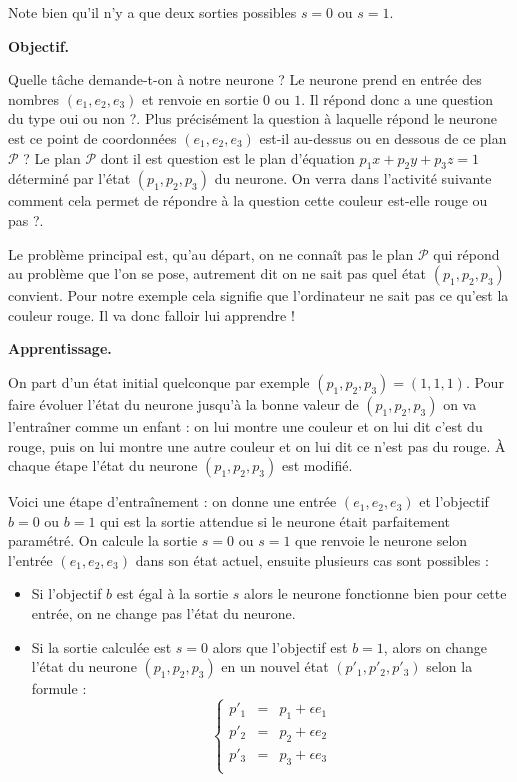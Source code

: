 \documentclass[11pt,class=report,crop=false]{standalone}
\begin{document}
\begin{cours}[Neurone]
Note bien qu'il n'y a que deux sorties possibles $s=0$ ou $s=1$.

\medskip
\textbf{Objectif.}

Quelle tâche demande-t-on à notre neurone ? Le neurone prend en entrée des nombres $(e_1,e_2,e_3)$ et renvoie en sortie $0$ ou $1$. Il répond donc a une question du type \og{}oui ou non ?\fg{}.
Plus précisément la question à laquelle répond le neurone est \og{}ce point de coordonnées $(e_1,e_2,e_3)$ est-il au-dessus ou en dessous de ce plan $\mathcal{P}$ ?\fg{} Le plan $\mathcal{P}$ dont il est question est le plan d'équation $p_1x+p_2y+p_3z=1$ déterminé par l'état $(p_1,p_2,p_3)$ du neurone.
On verra dans l'activité suivante comment cela permet de répondre à la question \og{}cette couleur est-elle rouge ou pas ?\fg{}.

Le problème principal est, qu'au départ, on ne connaît pas le plan $\mathcal{P}$ qui répond au problème que l'on se pose, autrement dit on ne sait pas quel état $(p_1,p_2,p_3)$ convient. Pour notre exemple cela signifie que l'ordinateur ne sait pas ce qu'est la couleur rouge. Il va donc falloir lui apprendre !

\medskip
\textbf{Apprentissage.}

On part d'un état initial quelconque par exemple $(p_1,p_2,p_3)=(1,1,1)$.
Pour faire évoluer l'état du neurone jusqu'à la bonne valeur de $(p_1,p_2,p_3)$ on 
va l'entraîner comme un enfant : on lui montre une couleur et on lui dit \og{}c'est du rouge\fg{}, puis on lui montre une autre couleur et on lui dit \og{}ce n'est pas du rouge\fg{}.
\`A chaque étape l'état du neurone $(p_1,p_2,p_3)$ est modifié.

Voici une étape d'entraînement : on donne une entrée $(e_1,e_2,e_3)$ et l'objectif $b=0$ ou $b=1$ qui est la sortie attendue si le neurone était parfaitement paramétré.
On calcule la sortie $s=0$ ou $s=1$ que renvoie le neurone selon l'entrée $(e_1,e_2,e_3)$ dans son état actuel, ensuite plusieurs cas sont possibles :
\begin{itemize} 
	\item Si l'objectif $b$ est égal à la sortie $s$ alors le neurone fonctionne bien pour cette entrée, on ne change pas l'état du neurone.
	
	\item Si la sortie calculée est $s=0$ alors que l'objectif est $b=1$, alors on change l'état du neurone $(p_1,p_2,p_3)$ en un nouvel état $(p'_1,p'_2,p'_3)$ selon la formule :
$$\left\{ 
\begin{array}{rcl}
p'_1 &=& p_1 + \epsilon e_1 \\
p'_2 &=& p_2 + \epsilon e_2 \\
p'_3 &=& p_3 + \epsilon e_3 \\
\end{array}
\right.$$			


\end{itemize}
\end{cours}
\end{document}
